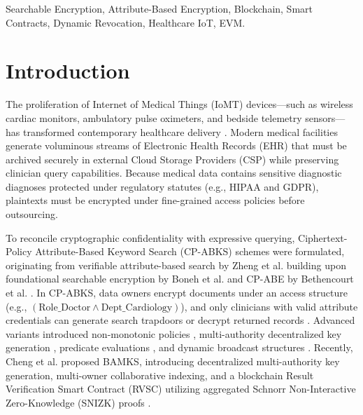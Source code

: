 \documentclass[conference]{IEEEtran}
\begin{document}
\begin{IEEEkeywords}
Searchable Encryption, Attribute-Based Encryption, Blockchain, Smart Contracts, Dynamic Revocation, Healthcare IoT, EVM.
\end{IEEEkeywords}

\section{Introduction}

The proliferation of Internet of Medical Things (IoMT) devices—such as wireless cardiac monitors, ambulatory pulse oximeters, and bedside telemetry sensors—has transformed contemporary healthcare delivery \cite{gupta2023security, dhinakaran2025safeguarding}. Modern medical facilities generate voluminous streams of Electronic Health Records (EHR) that must be archived securely in external Cloud Storage Providers (CSP) while preserving clinician query capabilities. Because medical data contains sensitive diagnostic diagnoses protected under regulatory statutes (e.g., HIPAA and GDPR), plaintexts must be encrypted under fine-grained access policies before outsourcing.

To reconcile cryptographic confidentiality with expressive querying, Ciphertext-Policy Attribute-Based Keyword Search (CP-ABKS) schemes were formulated, originating from verifiable attribute-based search by Zheng et al. \cite{zheng2014vabks} building upon foundational searchable encryption by Boneh et al. \cite{boneh2004peks} and CP-ABE by Bethencourt et al. \cite{bethencourt2007cpabe}. In CP-ABKS, data owners encrypt documents under an access structure (e.g., $(\text{Role\_Doctor} \land \text{Dept\_Cardiology})$), and only clinicians with valid attribute credentials can generate search trapdoors or decrypt returned records \cite{sahai2005fuzzy, waters2011expressive, goyal2006attribute}. Advanced variants introduced non-monotonic policies \cite{ostrovsky2007attribute}, multi-authority decentralized key generation \cite{chase2007multi, lewko2010multiauthority}, predicate evaluations \cite{katz2013predicate}, and dynamic broadcast structures \cite{delerablee2007dynamic}. Recently, Cheng et al. \cite{cheng2026bamks} proposed BAMKS, introducing decentralized multi-authority key generation, multi-owner collaborative indexing, and a blockchain Result Verification Smart Contract (RVSC) utilizing aggregated Schnorr Non-Interactive Zero-Knowledge (SNIZK) proofs \cite{schnorr1991}.
\end{document}

